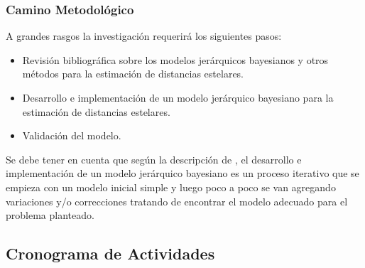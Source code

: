 \documentclass[stu, 12pt, letterpaper, donotrepeattitle, floatsintext, natbib]{apa7_ula}
\begin{document}
\subsubsection{Camino Metodológico}

A grandes rasgos la investigación requerirá los siguientes pasos:

\begin{itemize}
    \item Revisión bibliográfica sobre los modelos jerárquicos bayesianos y otros métodos para la estimación de distancias estelares.
    \item Desarrollo e implementación de un modelo jerárquico bayesiano para la estimación de distancias estelares.
    \item Validación del modelo.
\end{itemize}

Se debe tener en cuenta que según la descripción de 
\citet{gelman2020bayesian}, el desarrollo e implementación de un
modelo jerárquico bayesiano es un proceso iterativo que se empieza
con un modelo inicial simple y luego poco a poco se van agregando
variaciones y/o correcciones tratando de encontrar el modelo
adecuado para el problema planteado.

\subsection{Cronograma de Actividades}
\end{document}
